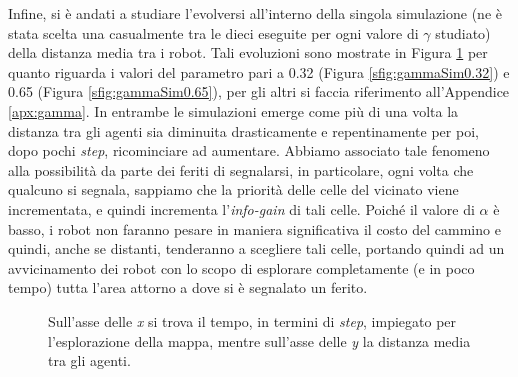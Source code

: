 Infine, si è andati a studiare l'evolversi all'interno della singola simulazione (ne è stata scelta una casualmente tra le dieci eseguite per ogni valore di $\gamma$ studiato) della distanza media tra i robot.
Tali evoluzioni sono mostrate in Figura \ref{fig:gammaSim} per quanto riguarda i valori del parametro pari a 0.32 (Figura \ref{sfig:gammaSim0.32}) e 0.65 (Figura \ref{sfig:gammaSim0.65}), per gli altri si faccia riferimento all'Appendice \ref{apx:gamma}.
In entrambe le simulazioni emerge come più di una volta la distanza tra gli agenti sia diminuita drasticamente e repentinamente per poi, dopo pochi \textit{step}, ricominciare ad aumentare.
Abbiamo associato tale fenomeno alla possibilità da parte dei feriti di segnalarsi, in particolare, ogni volta che qualcuno si segnala, sappiamo che la priorità delle celle del vicinato viene incrementata, e quindi incrementa l'\textit{info-gain} di tali celle. Poiché il valore di $\alpha$ è basso, i robot non faranno pesare in maniera significativa il costo del cammino e quindi, anche se distanti, tenderanno a scegliere tali celle, portando quindi ad un avvicinamento dei robot con lo scopo di esplorare completamente (e in poco tempo) tutta l'area attorno a dove si è segnalato un ferito.
\begin{figure}
	\hfill
	\caption{Sull'asse delle \textit{x} si trova il tempo, in termini di \textit{step}, impiegato per l'esplorazione della mappa, mentre sull'asse delle \textit{y} la distanza media tra gli agenti.}
	\label{fig:gammaSim}
\end{figure}

